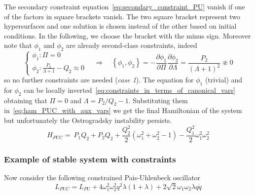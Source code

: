 The secondary constraint equation~\eqref{eq:secondary_constraint_PU}
vanish if one of the factors in square brackets vanish. The two square bracket
represent two hypersurfaces and one solution is chosen instead of the other
based on initial conditions. In the following, we choose the bracket with the
minus sign. Moreover note that $\phi_1$ and $\phi_2$ are already second-class
constraints, indeed
\begin{equation*}
  \begin{cases}
    \phi_1: \Pi = 0 \\
    \phi_2: \frac{P_2}{\Lambda + 1} - Q_2 \approx 0
  \end{cases}
  \quad \Rightarrow \quad
  \left\{ \phi_1, \phi_2 \right\} = -
  \frac{\partial\phi_1}{\partial\Pi} \frac{\partial\phi_2}{\partial\Lambda} =
  \frac{P_2}{{(\Lambda + 1)}^2} \not\approx 0
\end{equation*}
so no further constraints are needed (\emph{case 1}). The equation for
$\phi_1$ (trivial) and for $\phi_2$ can be locally
inverted~\eqref{eq:constraints_in_terms_of_canonical_vars} obtaining that
$\Pi = 0$ and $\Lambda = P_2/Q_2 - 1$. Substituting them
in~\eqref{eq:ham_PUC_with_aux_vars} we get the final Hamiltonian of the system
but unfortunately the Ostrogradsky instability persists.
\begin{equation} \label{eq:ham_PUC_instable}
   H_{PUC} =\ P_1 Q_2 + P_2 Q_2
  + \frac{Q_2^2}{2} \left(\omega_1^2 + \omega_2^2 - 1 \right)
  - \frac{Q_1^2}{2} \omega_1^2 \omega_2^2
\end{equation}


\subsubsection{Example of stable system with constraints}
Now consider the following constrained Pais-Uhlenbeck oscillator~\cite{Chen13}
\begin{equation}
  L_{PUC} = L_{PU} +
  4 \omega_1^2\omega_2^2 q^2 \lambda (1+ \lambda) +
  2 \sqrt{2} \omega_1\omega_2 \lambda q \ddot{q}
\end{equation}

